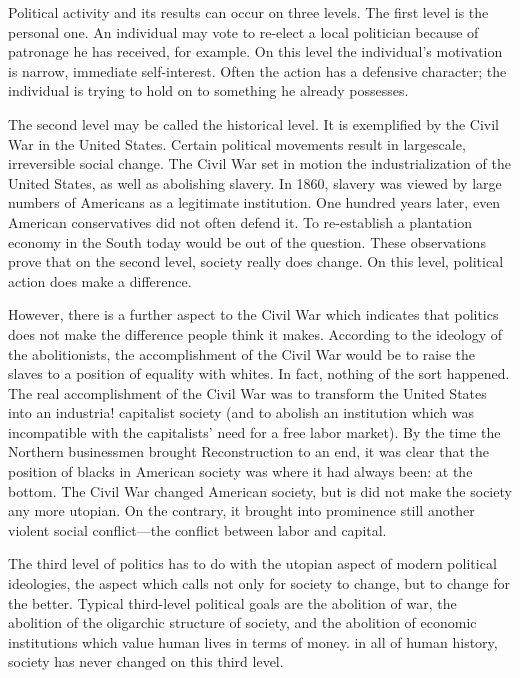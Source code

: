 \documentclass[10pt,twoside,draft]{memoir}
\begin{document}
{{{Political activity and its results can occur on three levels. The first level 
is the personal one. An individual may vote to re-elect a local politician 
because of patronage he has received, for example. On this level the 
individual's motivation is narrow, immediate self-interest. Often the action 
has a defensive character; the individual is trying to hold on to something he 
already possesses. 

The second level may be called the historical level. It is exemplified by 
the Civil War in the United States. Certain political movements result in 
largescale, irreversible social change. The Civil War set in motion the 
industrialization of the United States, as well as abolishing slavery. In 1860, 
slavery was viewed by large numbers of Americans as a legitimate institution. 
One hundred years later, even American conservatives did not often defend 
it. To re-establish a plantation economy in the South today would be out of 
the question. These observations prove that on the second level, society 
really does change. On this level, political action does make a difference. 

However, there is a further aspect to the Civil War which indicates that 
politics does not make the difference people think it makes. According to 
the ideology of the abolitionists, the accomplishment of the Civil War would 
be to raise the slaves to a position of equality with whites. In fact, nothing of 
the sort happened. The real accomplishment of the Civil War was to 
transform the United States into an industria! capitalist society (and to 
abolish an institution which was incompatible with the capitalists' need for a 
free labor market). By the time the Northern businessmen brought 
Reconstruction to an end, it was clear that the position of blacks in 
American society was where it had always been: at the bottom. The Civil 
War changed American society, but is did not make the society any more 
utopian. On the contrary, it brought into prominence still another violent 
social conflict---the conflict between labor and capital. 

The third level of politics has to do with the utopian aspect of modern 
political ideologies, the aspect which calls not only for society to change, but 
to change for the better. Typical third-level political goals are the abolition 
of war, the abolition of the oligarchic structure of society, and the abolition 
of economic institutions which value human lives in terms of money. in all 
of human history, society has never changed on this third level. 

}}}
\end{document}
